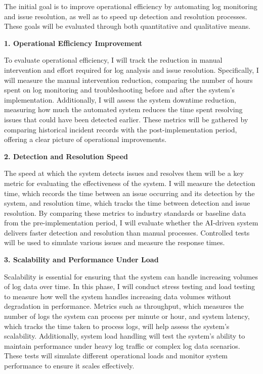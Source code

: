 The initial goal is to improve operational efficiency by automating log monitoring and issue resolution, as well as to speed up detection and resolution processes. These goals will be evaluated through both quantitative and qualitative means.

\textbf{1. Operational Efficiency Improvement}


To evaluate operational efficiency, I will track the reduction in manual intervention and effort required for log analysis and issue resolution. Specifically, I will measure the manual intervention reduction, comparing the number of hours spent on log monitoring and troubleshooting before and after the system’s implementation. Additionally, I will assess the system downtime reduction, measuring how much the automated system reduces the time spent resolving issues that could have been detected earlier. These metrics will be gathered by comparing historical incident records with the post-implementation period, offering a clear picture of operational improvements.



\textbf{2. Detection and Resolution Speed}


The speed at which the system detects issues and resolves them will be a key metric for evaluating the effectiveness of the system. I will measure the detection time, which records the time between an issue occurring and its detection by the system, and resolution time, which tracks the time between detection and issue resolution. By comparing these metrics to industry standards or baseline data from the pre-implementation period, I will evaluate whether the AI-driven system delivers faster detection and resolution than manual processes. Controlled tests will be used to simulate various issues and measure the response times.

\textbf{3. Scalability and Performance Under Load}


Scalability is essential for ensuring that the system can handle increasing volumes of log data over time. In this phase, I will conduct stress testing and load testing to measure how well the system handles increasing data volumes without degradation in performance. Metrics such as throughput, which measures the number of logs the system can process per minute or hour, and system latency, which tracks the time taken to process logs, will help assess the system’s scalability. Additionally, system load handling will test the system’s ability to maintain performance under heavy log traffic or complex log data scenarios. These tests will simulate different operational loads and monitor system performance to ensure it scales effectively.

